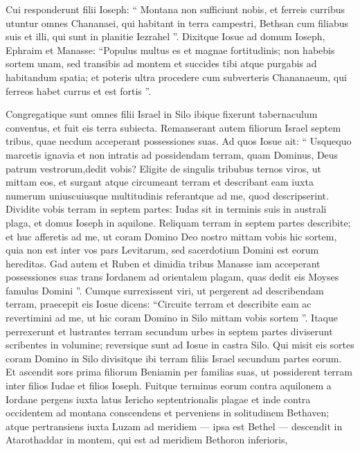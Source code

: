 \begin{biblechapter}
\begin{biblechapter}
\begin{biblechapter}
\begin{biblechapter}
\begin{biblechapter}
\begin{biblechapter}
\begin{biblechapter}
\begin{biblechapter}
\begin{biblechapter}
\begin{biblechapter}
\begin{biblechapter}
\begin{biblechapter}
\begin{biblechapter}
\begin{biblechapter}
\begin{biblechapter}
\begin{biblechapter}
\begin{biblechapter}
\verse Cui responderunt filii Ioseph: “ Montana non sufficiunt nobis, et ferreis curribus utuntur omnes Chananaei, qui habitant in terra campestri, Bethsan cum filiabus suis et illi, qui sunt in planitie Iezrahel ”. 
\verse Dixitque Iosue ad domum Ioseph, Ephraim et Manasse: “Populus multus es et magnae fortitudinis; non habebis sortem unam, 
 \verse sed transibis ad montem et succides tibi atque purgabis ad habitandum spatia; et poteris ultra procedere cum subverteris Chananaeum, qui ferreos habet currus et est fortis ”.
 
\begin{biblechapter}
\verse Congregatique sunt omnes filii Israel in Silo ibique fixerunt tabernaculum conventus, et fuit eis terra subiecta. 
\verse Remanserant autem filiorum Israel septem tribus, quae necdum acceperant possessiones suas. 
\verse Ad quos Iosue ait: “ Usquequo marcetis ignavia et non intratis ad possidendam terram, quam Dominus, Deus patrum vestrorum,dedit vobis? 
\verse Eligite de singulis tribubus ternos viros, ut mittam eos, et surgant atque circumeant terram et describant eam iuxta numerum uniuscuiusque multitudinis referantque ad me, quod descripserint. 
\verse Dividite vobis terram in septem partes: Iudas sit in terminis suis in australi plaga, et domus Ioseph in aquilone. 
\verse Reliquam terram in septem partes describite; et huc afferetis ad me, ut coram Domino Deo nostro mittam vobis hic sortem, 
\verse quia non est inter vos pars Levitarum, sed sacerdotium Domini est eorum hereditas. Gad autem et Ruben et dimidia tribus Manasse iam acceperant possessiones suas trans Iordanem ad orientalem plagam, quas dedit eis Moyses famulus Domini ”.
 \verse Cumque surrexissent viri, ut pergerent ad describendam terram, praecepit eis Iosue dicens: “Circuite terram et describite eam ac revertimini ad me, ut hic coram Domino in Silo mittam vobis sortem ”. 
\verse Itaque perrexerunt et lustrantes terram secundum urbes in septem partes diviserunt scribentes in volumine; reversique sunt ad Iosue in castra Silo. 
\verse Qui misit eis sortes coram Domino in Silo divisitque ibi terram filiis Israel secundum partes eorum.
 \verse Et ascendit sors prima filiorum Beniamin per familias suas, ut possiderent terram inter filios Iudae et filios Ioseph. 
\verse Fuitque terminus eorum contra aquilonem a Iordane pergens iuxta latus Iericho septentrionalis plagae et inde contra occidentem ad montana conscendens et perveniens in solitudinem Bethaven; 
\verse atque pertransiens iuxta Luzam ad meridiem — ipsa est Bethel — descendit in Atarothaddar in montem, qui est ad meridiem Bethoron inferioris, 

\end{biblechapter}
\end{biblechapter}
\end{biblechapter}
\end{biblechapter}
\end{biblechapter}
\end{biblechapter}
\end{biblechapter}
\end{biblechapter}
\end{biblechapter}
\end{biblechapter}
\end{biblechapter}
\end{biblechapter}
\end{biblechapter}
\end{biblechapter}
\end{biblechapter}
\end{biblechapter}
\end{biblechapter}
\end{biblechapter}
